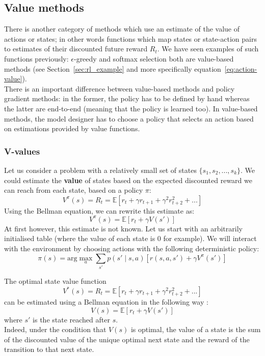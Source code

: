 \subsection{Value methods}
There is another category of methods which use an estimate of the value of
actions or states; in other words functions which map states or state-action
pairs to estimates of their discounted future reward $R_t$. We have seen
examples of such functions previously: $\epsilon$-greedy and softmax
selection both are value-based methods (see Section~\ref{sec:rl_example} and
more specifically equation~\ref{eq:action-value}).\\

There is an important
difference between value-based methods and policy gradient methods: in the
former, the policy has to be defined by hand whereas the latter are
end-to-end (meaning that the policy is learned too). In value-based methods,
the model designer has to choose a policy that selects an action based
on estimations provided by value functions.\\

\subsubsection{V-values} 
Let us consider a problem with a relatively small set of states 
$\{s_1, s_2, ..., s_k\}$. We could estimate the \textbf{value} of 
states based on the expected discounted reward we can reach from each state, 
based on a policy $\pi$: 
$$ V^\pi(s) = R_t = \mathbb{E}
   \left[ r_t + \gamma r_{t+1} + \gamma^2 r_{t+2}^2 + ...  \right]$$
Using the Bellman equation, we can rewrite this estimate as:
$$ V^\pi(s) = \mathbb{E}\left[ r_t + \gamma V(s')\right]$$
At first however, this estimate is not known. Let us start with an 
arbitrarily initialised table (where the value of each state is 0 for example).
We will interact with the environment by choosing actions with the following
deterministic policy:
$$ \pi(s) = \text{arg}\max\limits_a \sum\limits_{s'} p(s' \mid s, a)[r(s,a,s')
+ \gamma V^\pi(s')]$$

The optimal state value function 
$$ V^*(s) = R_t = \mathbb{E}
   \left[ r_t + \gamma r_{t+1} + \gamma^2 r_{t+2}^2 + ...  \right]$$
can be estimated using a Bellman equation in the following way :
$$ V(s) = \mathbb{E}\left[ r_t + \gamma V(s')\right]$$
where $s'$ is the state reached after $s$.\\

Indeed, under the condition that $V(s)$ is optimal, the value of a state is the 
sum of the discounted value of the unique optimal next state and the reward of
the transition to that next state.\\

